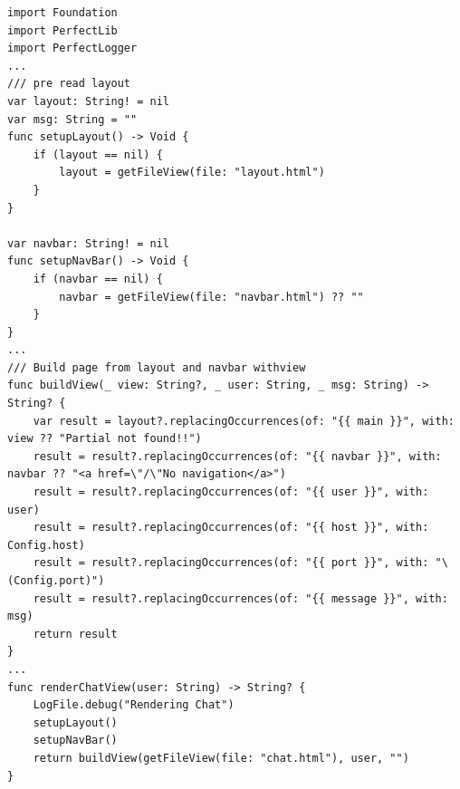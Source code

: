 \begin{lstlisting}
import Foundation
import PerfectLib
import PerfectLogger
...
/// pre read layout
var layout: String! = nil
var msg: String = ""
func setupLayout() -> Void {
    if (layout == nil) {
        layout = getFileView(file: "layout.html")
    }
}

var navbar: String! = nil
func setupNavBar() -> Void {
    if (navbar == nil) {
        navbar = getFileView(file: "navbar.html") ?? ""
    }
}
...
/// Build page from layout and navbar withview
func buildView(_ view: String?, _ user: String, _ msg: String) -> String? {
    var result = layout?.replacingOccurrences(of: "{{ main }}", with: view ?? "Partial not found!!")
    result = result?.replacingOccurrences(of: "{{ navbar }}", with: navbar ?? "<a href=\"/\"No navigation</a>")
    result = result?.replacingOccurrences(of: "{{ user }}", with: user)
    result = result?.replacingOccurrences(of: "{{ host }}", with: Config.host)
    result = result?.replacingOccurrences(of: "{{ port }}", with: "\(Config.port)")
    result = result?.replacingOccurrences(of: "{{ message }}", with: msg)
    return result
}
...
func renderChatView(user: String) -> String? {
    LogFile.debug("Rendering Chat")
    setupLayout()
    setupNavBar()
    return buildView(getFileView(file: "chat.html"), user, "")
}
\end{lstlisting}

